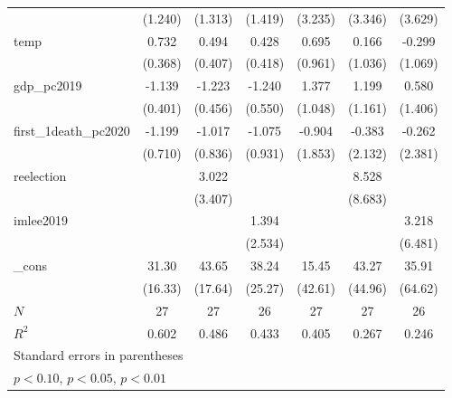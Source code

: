 {\begin{tabular}{l*{6}{c}}
            &     (1.240)         &     (1.313)         &     (1.419)         &     (3.235)         &     (3.346)         &     (3.629)         \\
[1em]
temp        &       0.732\sym{*}  &       0.494         &       0.428         &       0.695         &       0.166         &      -0.299         \\
            &     (0.368)         &     (0.407)         &     (0.418)         &     (0.961)         &     (1.036)         &     (1.069)         \\
[1em]
gdp\_pc2019  &      -1.139\sym{**} &      -1.223\sym{**} &      -1.240\sym{**} &       1.377         &       1.199         &       0.580         \\
            &     (0.401)         &     (0.456)         &     (0.550)         &     (1.048)         &     (1.161)         &     (1.406)         \\
[1em]
first\_1death\_pc2020&      -1.199         &      -1.017         &      -1.075         &      -0.904         &      -0.383         &      -0.262         \\
            &     (0.710)         &     (0.836)         &     (0.931)         &     (1.853)         &     (2.132)         &     (2.381)         \\
[1em]
reelection  &                     &       3.022         &                     &                     &       8.528         &                     \\
            &                     &     (3.407)         &                     &                     &     (8.683)         &                     \\
[1em]
imlee2019   &                     &                     &       1.394         &                     &                     &       3.218         \\
            &                     &                     &     (2.534)         &                     &                     &     (6.481)         \\
[1em]
\_cons      &       31.30\sym{*}  &       43.65\sym{**} &       38.24         &       15.45         &       43.27         &       35.91         \\
            &     (16.33)         &     (17.64)         &     (25.27)         &     (42.61)         &     (44.96)         &     (64.62)         \\
\hline
\(N\)       &          27         &          27         &          26         &          27         &          27         &          26         \\
\(R^{2}\)   &       0.602         &       0.486         &       0.433         &       0.405         &       0.267         &       0.246         \\
\hline\hline
\multicolumn{7}{l}{\footnotesize Standard errors in parentheses}\\
\multicolumn{7}{l}{\footnotesize \sym{*} \(p<0.10\), \sym{**} \(p<0.05\), \sym{***} \(p<0.01\)}\\
\end{tabular}
}

